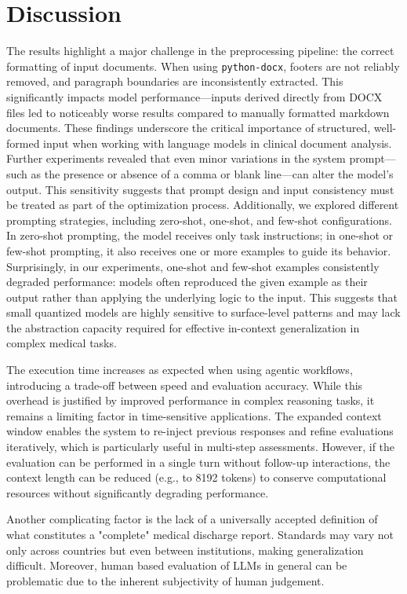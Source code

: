 \section{Discussion}

The results highlight a major challenge in the preprocessing pipeline: the
correct formatting of input documents. When using \texttt{python-docx}, footers
are not reliably removed, and paragraph boundaries are inconsistently
extracted. This significantly impacts model performance—inputs derived directly
from DOCX files led to noticeably worse results compared to manually formatted
markdown documents. These findings underscore the critical importance of
structured, well-formed input when working with language models in clinical
document analysis.
Further experiments revealed that even minor variations in the system
prompt—such as the presence or absence of a comma or blank line—can alter the
model's output. This sensitivity suggests that prompt design and input
consistency must be treated as part of the optimization process.\cite{p1}
Additionally, we explored different prompting strategies, including zero-shot,
one-shot, and few-shot configurations. In zero-shot prompting, the model
receives only task instructions; in one-shot or few-shot prompting, it also
receives one or more examples to guide its behavior.\cite{p2} Surprisingly, in our experiments, one-shot and few-shot examples consistently degraded performance: models often reproduced the given example as their output rather than applying the underlying logic to the input. This suggests that small quantized models are highly sensitive to surface-level patterns and may lack the abstraction capacity required for effective in-context generalization in complex medical tasks.

The execution time increases as expected when using agentic workflows, introducing a trade-off between speed and evaluation accuracy. While this overhead is justified by improved performance in complex reasoning tasks, it remains a limiting factor in time-sensitive applications. The expanded context window enables the system to re-inject previous responses and refine evaluations iteratively, which is particularly useful in multi-step assessments. However, if the evaluation can be performed in a single turn without follow-up interactions, the context length can be reduced (e.g., to 8192 tokens) to conserve computational resources without significantly degrading performance.

Another complicating factor is the lack of a universally accepted definition of
what constitutes a "complete" medical discharge report. Standards may vary not
only across countries but even between institutions, making generalization
difficult. Moreover, human based evaluation of LLMs in general can be problematic
due to the inherent subjectivity of human judgement.\cite{p3}

